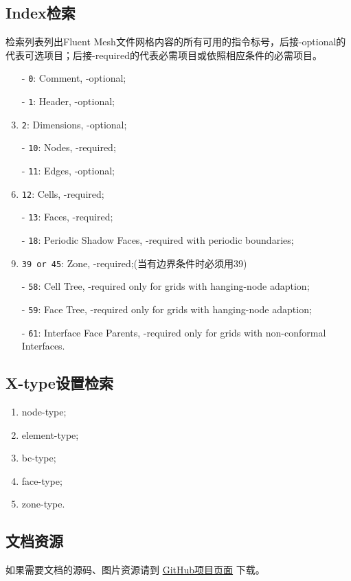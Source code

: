 \documentclass[lang=cn,11pt,a4paper]{elegantpaper} %
\begin{document}
\subsection{Index检索}
检索列表列出Fluent Mesh文件网格内容的所有可用的指令标号，后接-optional的代表可选项目；后接-required的代表必需项目或依照相应条件的必需项目。
\begin{enumerate}
  \item[-] \lstinline{0}: Comment, -optional;
  \item[-] \lstinline{1}: Header, -optional;
  \item[-] \lstinline{2}: Dimensions, -optional;
  \item[-] \lstinline{10}: Nodes, -required;
  \item[-] \lstinline{11}: Edges, -optional;
  \item[-] \lstinline{12}: Cells, -required;
  \item[-] \lstinline{13}: Faces, -required;
  \item[-] \lstinline{18}: Periodic Shadow Faces, -required with periodic boundaries;
  \item[-] \lstinline{39 or 45}: Zone, -required;(当有边界条件时必须用39)
  \item[-] \lstinline{58}: Cell Tree, -required only for grids with hanging-node adaption;
  \item[-] \lstinline{59}: Face Tree, -required only for grids with hanging-node adaption;
  \item[-] \lstinline{61}: Interface Face Parents, -required only for grids with non-conformal Interfaces.
\end{enumerate}

\subsection{X-type设置检索}
\begin{enumerate}
  \item node-type;
  \item element-type;
  \item bc-type;
  \item face-type;
  \item zone-type.
\end{enumerate}

\subsection{文档资源}
如果需要文档的源码、图片资源请到
\href{https://github.com/iforever-yh/Fluent-mesh-format}{GitHub项目页面}
下载。
\end{document}
